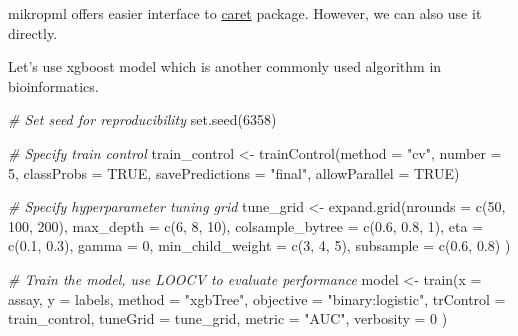 \documentclass[
]{book}
\newenvironment{Shaded}{\begin{snugshade}}{\end{snugshade}}
\newcommand{\AttributeTok}[1]{\textcolor[rgb]{0.77,0.63,0.00}{#1}}
\newcommand{\CommentTok}[1]{\textcolor[rgb]{0.56,0.35,0.01}{\textit{#1}}}
\newcommand{\ConstantTok}[1]{\textcolor[rgb]{0.00,0.00,0.00}{#1}}
\newcommand{\DecValTok}[1]{\textcolor[rgb]{0.00,0.00,0.81}{#1}}
\newcommand{\FloatTok}[1]{\textcolor[rgb]{0.00,0.00,0.81}{#1}}
\newcommand{\FunctionTok}[1]{\textcolor[rgb]{0.00,0.00,0.00}{#1}}
\newcommand{\NormalTok}[1]{#1}
\newcommand{\OtherTok}[1]{\textcolor[rgb]{0.56,0.35,0.01}{#1}}
\newcommand{\StringTok}[1]{\textcolor[rgb]{0.31,0.60,0.02}{#1}}
\begin{document}
mikropml offers easier interface to \href{https://cran.r-project.org/web/packages/caret/index.html}{caret}
package. However, we can also use it directly.

Let's use xgboost model which is another commonly used algorithm in bioinformatics.

\begin{Shaded}
\begin{Highlighting}[]
\CommentTok{\# Set seed for reproducibility}
\FunctionTok{set.seed}\NormalTok{(}\DecValTok{6358}\NormalTok{)}

\CommentTok{\# Specify train control}
\NormalTok{train\_control }\OtherTok{\textless{}{-}} \FunctionTok{trainControl}\NormalTok{(}\AttributeTok{method =} \StringTok{"cv"}\NormalTok{, }\AttributeTok{number =} \DecValTok{5}\NormalTok{,}
                              \AttributeTok{classProbs =} \ConstantTok{TRUE}\NormalTok{, }
                              \AttributeTok{savePredictions =} \StringTok{"final"}\NormalTok{,}
                              \AttributeTok{allowParallel =} \ConstantTok{TRUE}\NormalTok{)}

\CommentTok{\# Specify hyperparameter tuning grid}
\NormalTok{tune\_grid }\OtherTok{\textless{}{-}} \FunctionTok{expand.grid}\NormalTok{(}\AttributeTok{nrounds =} \FunctionTok{c}\NormalTok{(}\DecValTok{50}\NormalTok{, }\DecValTok{100}\NormalTok{, }\DecValTok{200}\NormalTok{),}
                         \AttributeTok{max\_depth =} \FunctionTok{c}\NormalTok{(}\DecValTok{6}\NormalTok{, }\DecValTok{8}\NormalTok{, }\DecValTok{10}\NormalTok{),}
                         \AttributeTok{colsample\_bytree =} \FunctionTok{c}\NormalTok{(}\FloatTok{0.6}\NormalTok{, }\FloatTok{0.8}\NormalTok{, }\DecValTok{1}\NormalTok{),}
                         \AttributeTok{eta =} \FunctionTok{c}\NormalTok{(}\FloatTok{0.1}\NormalTok{, }\FloatTok{0.3}\NormalTok{),}
                         \AttributeTok{gamma =} \DecValTok{0}\NormalTok{,}
                         \AttributeTok{min\_child\_weight =} \FunctionTok{c}\NormalTok{(}\DecValTok{3}\NormalTok{, }\DecValTok{4}\NormalTok{, }\DecValTok{5}\NormalTok{),}
                         \AttributeTok{subsample =} \FunctionTok{c}\NormalTok{(}\FloatTok{0.6}\NormalTok{, }\FloatTok{0.8}\NormalTok{)}
\NormalTok{                         )}

\CommentTok{\# Train the model, use LOOCV to evaluate performance}
\NormalTok{model }\OtherTok{\textless{}{-}} \FunctionTok{train}\NormalTok{(}\AttributeTok{x =}\NormalTok{ assay, }
               \AttributeTok{y =}\NormalTok{ labels, }
               \AttributeTok{method =} \StringTok{"xgbTree"}\NormalTok{,}
               \AttributeTok{objective =} \StringTok{"binary:logistic"}\NormalTok{,}
               \AttributeTok{trControl =}\NormalTok{ train\_control,}
               \AttributeTok{tuneGrid =}\NormalTok{ tune\_grid,}
               \AttributeTok{metric =} \StringTok{"AUC"}\NormalTok{,}
               \AttributeTok{verbosity =} \DecValTok{0}
\NormalTok{)}
\end{Highlighting}
\end{Shaded}
\end{document}
